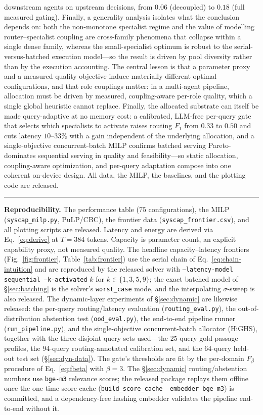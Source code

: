 \documentclass[11pt]{article}
\begin{document}
downstream agents on upstream decisions, from $0.06$ (decoupled) to $0.18$ (full
measured gating). Finally, a generality analysis isolates what the conclusion
depends on: both the non-monotone specialist regime and the value of modelling
router--specialist coupling are cross-family phenomena that collapse within a single
dense family, whereas the small-specialist optimum is robust to the
serial-versus-batched execution model---so the result is driven by pool
diversity rather than by the execution accounting. The central lesson is that a
parameter proxy and a measured-quality objective induce materially different
optimal configurations, and that role couplings matter: in a multi-agent pipeline,
allocation must be driven by measured, coupling-aware per-role quality, which a
single global heuristic cannot replace. Finally, the allocated substrate can itself
be made query-adaptive at no memory cost: a calibrated, LLM-free per-query gate that
selects which specialists to activate raises routing $F_1$ from $0.33$ to $0.50$ and
cuts latency $10$--$33\%$ with a gain independent of the underlying allocation, and a
single-objective concurrent-batch MILP confirms batched serving Pareto-dominates
sequential serving in quality and feasibility---so static allocation, coupling-aware
optimization, and per-query adaptation compose into one coherent on-device design.
All data, the MILP, the baselines, and the
plotting code are released.

\vspace{6pt}
\hrule
\vspace{4pt}
{\small\textbf{Reproducibility.} The performance table ($75$ configurations), the
MILP (\texttt{syscap\_milp.py}, PuLP/CBC), the frontier data
(\texttt{syscap\_frontier.csv}), and all plotting scripts are released. Latency
and energy are derived via Eq.~\eqref{eq:derive} at $T=384$ tokens. Capacity is
parameter count, an explicit capability proxy, not measured quality. The headline
capacity--latency frontiers (Fig.~\ref{fig:frontier}, Table~\ref{tab:frontier}) use
the serial chain of Eq.~\eqref{eq:chain-intuition} and are reproduced by the released
solver with \texttt{--latency-model sequential --k-activated} $k$ for
$k\in\{1,3,5,9\}$; the exact batched model of §\ref{sec:batching} is the solver's
\texttt{worst\_case} mode, and the interpolating $\sigma$-sweep is also released. The
dynamic-layer experiments of §\ref{sec:dynamic} are likewise released: the
per-query routing/latency evaluation (\texttt{routing\_eval.py}), the
out-of-distribution abstention test (\texttt{ood\_eval.py}), the end-to-end pipeline
runner (\texttt{run\_pipeline.py}), and the single-objective concurrent-batch
allocator (HiGHS), together with the three disjoint query sets used---the $25$-query
gold-passage profiles, the $94$-query routing-annotated calibration set, and the
$64$-query held-out test set (§\ref{sec:dyn-data}). The gate's thresholds are fit by
the per-domain $F_\beta$ procedure of Eq.~\eqref{eq:fbeta} with $\beta=3$. The §\ref{sec:dynamic}
routing/abstention numbers use \texttt{bge-m3} relevance scores; the released
package replays them offline once the one-time score cache
(\texttt{build\_score\_cache --embedder bge-m3}) is committed, and a
dependency-free hashing embedder validates the pipeline end-to-end without it.}
\end{document}
